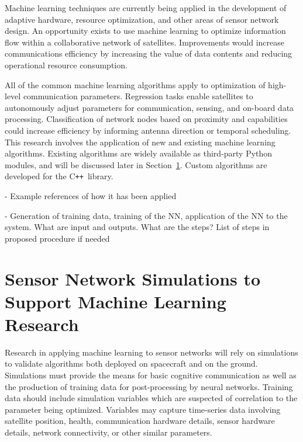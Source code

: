 \documentclass[conference]{IEEEtran}
\newcommand{\cpp}{C\texttt{++}~}
\begin{document}
Machine learning techniques are currently being applied in the development of adaptive hardware, resource optimization, and other areas of sensor network design.  An opportunity exists to use machine learning to optimize information flow within a collaborative network of satellites.  Improvements would increase communications efficiency by increasing the value of data contents and reducing operational resource consumption.

All of the common machine learning algorithms apply to optimization of high-level communication parameters.  Regression tasks enable satellites to autonomously adjust parameters for communication, sensing, and on-board data processing.  Classification of network nodes based on proximity and capabilities could increase efficiency by informing antenna direction or temporal scheduling.  This research involves the application of new and existing machine learning algorithms.  Existing algorithms are widely available as third-party Python modules, and will be discussed later in Section~\ref{sec:software}.  Custom algorithms are developed for the \cpp library.

{
  \color{red}
  - Example references of how it has been applied

  - Generation of training data, training of the NN, application of the NN to the system. What are input and outputs. What are the steps? List of steps in proposed procedure if needed
}

\vspace{70pt}


\section{Sensor Network Simulations to Support Machine Learning Research}
\label{sec:software}

Research in applying machine learning to sensor networks will rely on simulations to validate algorithms both deployed on spacecraft and on the ground.  Simulations must provide the means for basic cognitive communication as well as the production of training data for post-processing by neural networks.  Training data should include simulation variables which are suspected of correlation to the parameter being optimized.  Variables may capture time-series data involving satellite position, health, communication hardware details, sensor hardware details, network connectivity, or other similar parameters.
\end{document}
